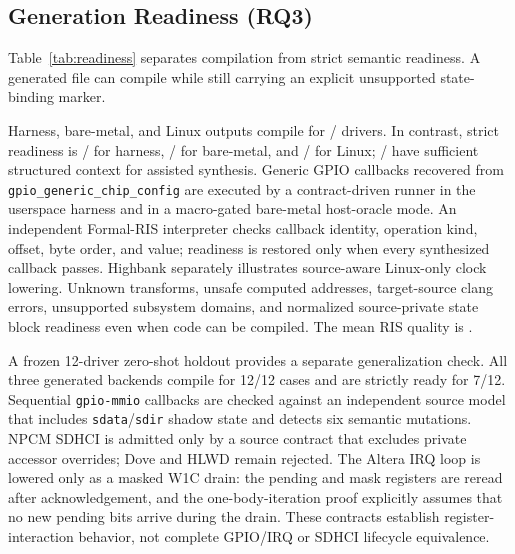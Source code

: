 \documentclass[sigconf,review]{acmart}
\begin{document}
\subsection{Generation Readiness (RQ3)}

Table~\ref{tab:readiness} separates compilation from strict semantic readiness. A generated file can compile while still carrying an explicit unsupported state-binding marker.

\begin{table}[t]
\centering
\caption{Generation readiness scores per driver.}
\label{tab:readiness}
\resizebox{\columnwidth}{!}{\ReadinessResultsTable}
\end{table}

Harness, bare-metal, and Linux outputs compile for \EvalDrivers{}/\EvalDrivers{} drivers. In contrast, strict readiness is \HarnessReadyCount{}/\EvalDrivers{} for harness, \BaremetalReadyCount{}/\EvalDrivers{} for bare-metal, and \LinuxReadyCount{}/\EvalDrivers{} for Linux; \LLMReadyCount{}/\EvalDrivers{} have sufficient structured context for assisted synthesis. Generic GPIO callbacks recovered from \texttt{gpio\_generic\_chip\_config} are executed by a contract-driven runner in the userspace harness and in a macro-gated bare-metal host-oracle mode. An independent Formal-RIS interpreter checks callback identity, operation kind, offset, byte order, and value; readiness is restored only when every synthesized callback passes. Highbank separately illustrates source-aware Linux-only clock lowering. Unknown transforms, unsafe computed addresses, target-source clang errors, unsupported subsystem domains, and normalized source-private state block readiness even when code can be compiled. The mean RIS quality is \EvalMeanRIS{}.

A frozen 12-driver zero-shot holdout provides a separate generalization check. All three generated backends compile for 12/12 cases and are strictly ready for 7/12. Sequential \texttt{gpio-mmio} callbacks are checked against an independent source model that includes \texttt{sdata}/\texttt{sdir} shadow state and detects six semantic mutations. NPCM SDHCI is admitted only by a source contract that excludes private accessor overrides; Dove and HLWD remain rejected. The Altera IRQ loop is lowered only as a masked W1C drain: the pending and mask registers are reread after acknowledgement, and the one-body-iteration proof explicitly assumes that no new pending bits arrive during the drain. These contracts establish register-interaction behavior, not complete GPIO/IRQ or SDHCI lifecycle equivalence.
\end{document}
